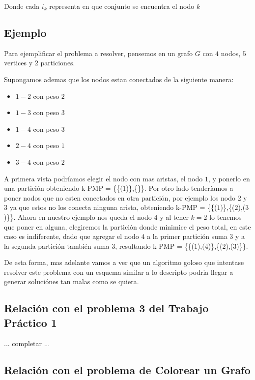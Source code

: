 Donde cada $i_k$ representa en que conjunto se encuentra el nodo $k$

\subsection{Ejemplo}

Para ejemplificar el problema a resolver, pensemos en un grafo $G$ con $4$ nodos, $5$ vertices y $2$ particiones.

Supongamos ademas que los nodos estan conectados de la siguiente manera:

\begin{itemize}

	\item $1-2$ con peso $2$
	\item $1-3$ con peso $3$
	\item $1-4$ con peso $3$
	\item $2-4$ con peso $1$
	\item $3-4$ con peso $2$

\end{itemize}

A primera vista podríamos elegir el nodo con mas aristas, el nodo $1$, y ponerlo en una partición obteniendo k-PMP = \{\{($1$)\},\{\}\}. Por otro lado tenderíamos a poner nodos que no esten conectados en otra partición, por ejemplo los nodo $2$ y $3$ ya que estos no los conecta ninguna arista, obteniendo k-PMP = \{\{($1$)\},\{($2$),($3$)\}\}. Ahora en nuestro ejemplo nos queda el nodo $4$ y al tener $k = 2$ lo tenemos que poner en alguna, elegiremos la partición donde minimice el peso total, en este caso es indiferente, dado que agregar el nodo $4$ a la primer partición suma $3$ y a la segunda partición también suma $3$, resultando k-PMP = \{\{($1$),($4$)\},\{($2$),($3$)\}\}. 

De esta forma, mas adelante vamos a ver que un algoritmo goloso que intentase resolver este problema con un esquema similar a lo descripto podria llegar a generar soluciónes tan malas como se quiera.

\subsection{Relación con el problema 3 del Trabajo Práctico 1}

... completar ...

\subsection{Relación con el problema de Colorear un Grafo}

